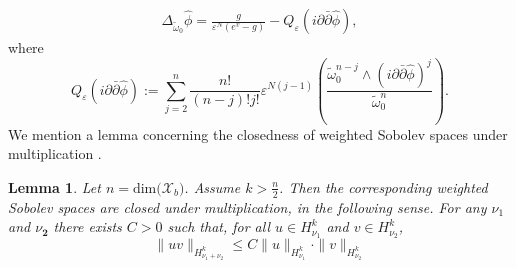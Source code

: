 \documentclass[a4paper,11pt]{article}
\newcounter{mythm}[section]
\newtheorem{lm}[mythm]{Lemma}
\begin{document}
\begin{align} \label{MAdiv}
\Delta_{\tilde \omega_0} \hat \phi = \frac{g}{\varepsilon^N (e^{v} - g)} - Q_{\varepsilon}(i \partial \bar{\partial} \hat \phi),
\end{align}
where 
$$
Q_{\varepsilon}(i \partial \bar{\partial} \hat \phi):=\sum_{j=2}^n \frac{n!}{(n-j)!j!} \varepsilon^{N(j-1)}\left(\frac{\tilde \omega_0^{n-j} \wedge(i \partial \bar{\partial} \hat \phi)^j}{\tilde \omega_0^n} \right).
$$
We mention a lemma concerning the closedness of weighted Sobolev spaces under multiplication \cite[corollary 6.8]{pacini_desingularizing_2013}. 
\begin{lm} \label{lmmult}
 Let $n=\text{dim($\mathcal{X}_b$)}$. Assume $k >\frac{n}{2}$. Then the corresponding weighted Sobolev spaces are closed under multiplication, in the following sense. For any $\nu_1$ and $\nu_{\mathbf{2}}$ there exists $C>0$ such that, for all $u \in H_{ \nu_1}^k$ and $v \in H_{ \nu_2}^k$,
$$
\|u v\|_{H_{\nu_1 + \nu_2}^k} \leq C\|u\|_{H_{ \nu_1}^k} \cdot\|v\|_{H_{ \nu_2}^k}
$$ 
\end{lm}
\end{document}
